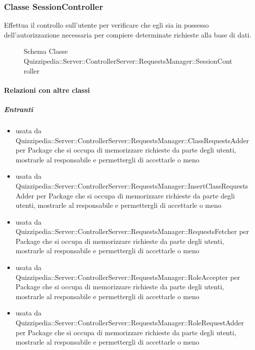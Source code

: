 \subsubsection{Classe SessionController}
Effettua il controllo sull'utente per verificare che egli sia in possesso dell'autorizzazione necessaria per compiere determinate richieste alla base di dati.
\begin{figure}[H]
\centering
\noindent{}
\caption[Schema Classe SessionController]{Schema Classe Quizzipedia::Server::ControllerServer::RequestsManager::SessionController}
\end{figure}
\paragraph{Relazioni con altre classi}
\subparagraph{Entranti}
\begin{itemize}
\item usata da Quizzipedia::Server::ControllerServer::RequestsManager::ClassRequestsAdder per Package che si occupa di memorizzare richieste da parte degli utenti, mostrarle al responsabile e permettergli di accettarle o meno
\item usata da Quizzipedia::Server::ControllerServer::RequestsManager::InsertClassRequestsAdder per Package che si occupa di memorizzare richieste da parte degli utenti, mostrarle al responsabile e permettergli di accettarle o meno
\item usata da Quizzipedia::Server::ControllerServer::RequestsManager::RequestsFetcher per Package che si occupa di memorizzare richieste da parte degli utenti, mostrarle al responsabile e permettergli di accettarle o meno
\item usata da Quizzipedia::Server::ControllerServer::RequestsManager::RoleAccepter per Package che si occupa di memorizzare richieste da parte degli utenti, mostrarle al responsabile e permettergli di accettarle o meno
\item usata da Quizzipedia::Server::ControllerServer::RequestsManager::RoleRequestAdder per Package che si occupa di memorizzare richieste da parte degli utenti, mostrarle al responsabile e permettergli di accettarle o meno
\end{itemize}
